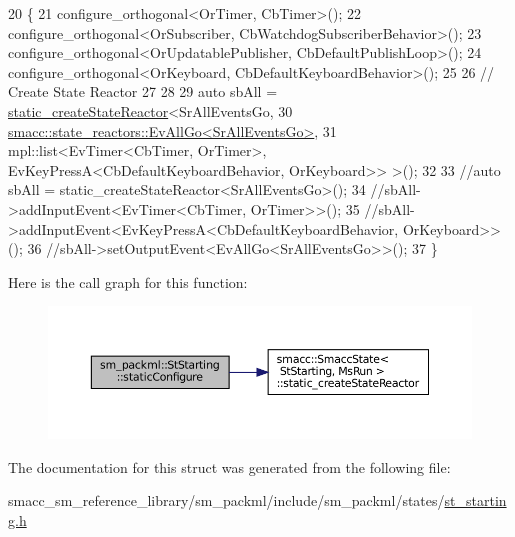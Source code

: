 \begin{DoxyCode}
20     \{
21         configure\_orthogonal<OrTimer, CbTimer>();
22         configure\_orthogonal<OrSubscriber, CbWatchdogSubscriberBehavior>();
23         configure\_orthogonal<OrUpdatablePublisher, CbDefaultPublishLoop>();
24         configure\_orthogonal<OrKeyboard, CbDefaultKeyboardBehavior>();
25 
26         \textcolor{comment}{// Create State Reactor}
27         
28 
29         \textcolor{keyword}{auto} sbAll = \hyperlink{classsmacc_1_1SmaccState_a892be704b48f93bf5c35635d1a58ed54}{static\_createStateReactor}<SrAllEventsGo, 
30                                                 
      \hyperlink{structsmacc_1_1state__reactors_1_1EvAllGo}{smacc::state\_reactors::EvAllGo<SrAllEventsGo>}, 
31                                                 mpl::list<EvTimer<CbTimer, OrTimer>, 
      EvKeyPressA<CbDefaultKeyboardBehavior, OrKeyboard>> >();
32 
33         \textcolor{comment}{//auto sbAll = static\_createStateReactor<SrAllEventsGo>();}
34         \textcolor{comment}{//sbAll->addInputEvent<EvTimer<CbTimer, OrTimer>>();}
35         \textcolor{comment}{//sbAll->addInputEvent<EvKeyPressA<CbDefaultKeyboardBehavior, OrKeyboard>>();}
36         \textcolor{comment}{//sbAll->setOutputEvent<EvAllGo<SrAllEventsGo>>();}
37     \}
\end{DoxyCode}
Here is the call graph for this function\+:
\nopagebreak
\begin{figure}[H]
\begin{center}
\leavevmode
\includegraphics[width=350pt]{structsm__packml_1_1StStarting_a41a4418153e0a3756f8f5f93d13aa16d_cgraph}
\end{center}
\end{figure}


The documentation for this struct was generated from the following file\+:\begin{DoxyCompactItemize}
\item 
smacc\+\_\+sm\+\_\+reference\+\_\+library/sm\+\_\+packml/include/sm\+\_\+packml/states/\hyperlink{st__starting_8h}{st\+\_\+starting.\+h}\end{DoxyCompactItemize}
